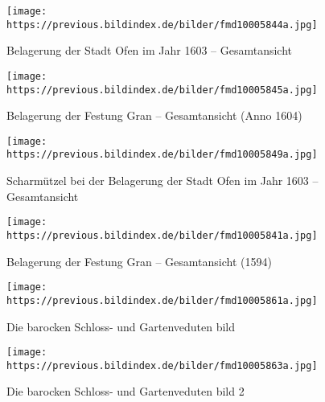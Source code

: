 \documentclass[
  a4paper,
]{book}
\begin{document}
\begin{figure*}
\clearpage

\begin{figure}[H]    
  \texttt{[image: https://previous.bildindex.de/bilder/fmd10005844a.jpg]}
  \caption{Belagerung der Stadt Ofen im Jahr 1603 – Gesamtansicht}
  \label{fig:{https://previous.bildindex.de/bilder/fmd10005844a.jpg}}
\end{figure}

\clearpage

\begin{figure}[H]    
  \texttt{[image: https://previous.bildindex.de/bilder/fmd10005845a.jpg]}
  \caption{Belagerung der Festung Gran – Gesamtansicht (Anno 1604)}
  \label{fig:{https://previous.bildindex.de/bilder/fmd10005845a.jpg}}
\end{figure}

\clearpage

\begin{figure}[H]    
  \texttt{[image: https://previous.bildindex.de/bilder/fmd10005849a.jpg]}
  \caption{Scharmützel bei der Belagerung der Stadt Ofen im Jahr 1603 – Gesamtansicht}
  \label{fig:{https://previous.bildindex.de/bilder/fmd10005849a.jpg}}
\end{figure}

\clearpage

\begin{figure}[H]    
  \texttt{[image: https://previous.bildindex.de/bilder/fmd10005841a.jpg]}
  \caption{Belagerung der Festung Gran – Gesamtansicht (1594)}
  \label{fig:{https://previous.bildindex.de/bilder/fmd10005841a.jpg}}
\end{figure}

\clearpage

\begin{figure}[H]    
  \texttt{[image: https://previous.bildindex.de/bilder/fmd10005861a.jpg]}
  \caption{Die barocken Schloss- und Gartenveduten bild}
  \label{fig:{https://previous.bildindex.de/bilder/fmd10005861a.jpg}}
\end{figure}

\clearpage

\begin{figure}[H]    
  \texttt{[image: https://previous.bildindex.de/bilder/fmd10005863a.jpg]}
  \caption{Die barocken Schloss- und Gartenveduten bild 2}
  \label{fig:{https://previous.bildindex.de/bilder/fmd10005863a.jpg}}
\end{figure}

\clearpage


\end{figure*}
\end{document}
